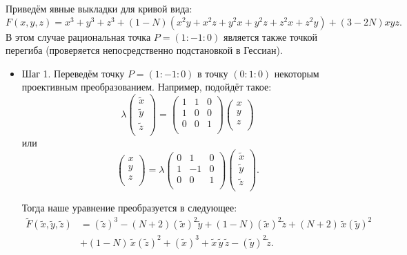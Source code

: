 \noindent Приведём явные выкладки для кривой вида:
\[
F(x, y, z) = x^3 + y^3 + z^3 + (1 - N) (x^2 y + x^2 z + y^2 x + y^2 z + z^2 x + z^2 y) +
(3 - 2 N) x y z 
.\] 
В этом случае рациональная точка \(P = (1 : -1 : 0)\) является также точкой перегиба
(проверяется непосредственно подстановкой в Гессиан).

\begin{itemize}[leftmargin=0.6cm]
    \item Шаг 1. Переведём точку \(P = (1 : -1 : 0)\) в точку
    \((0 : 1 : 0)\) некоторым проективным преобразованием. Например,
    подойдёт такое:
    \[
    \lambda
    \begin{pmatrix}
        \widetilde{x} \\
        \widetilde{y} \\
        \widetilde{z} \\
    \end{pmatrix} 
    = 
    \begin{pmatrix}
        1 & 1 & 0 \\
        1 & 0 & 0 \\
        0 & 0 & 1 \\
    \end{pmatrix}
    \begin{pmatrix}
        x \\
        y \\
        z \\
    \end{pmatrix}
    \]
    или
    \[
    \begin{pmatrix}
        x \\
        y \\
        z \\
    \end{pmatrix} =
    \lambda
    \begin{pmatrix}
        0 & 1 & 0 \\
        1 & -1 & 0 \\
        0 & 0 & 1 \\
    \end{pmatrix}
    \begin{pmatrix}
        \widetilde{x} \\
        \widetilde{y} \\
        \widetilde{z} \\
    \end{pmatrix} 
    .\] 
    

    Тогда наше уравнение преобразуется в следующее:  
    \begin{align*}
        \widetilde{F}(\widetilde{x}, \widetilde{y}, \widetilde{z}) &= 
     \left(\widetilde{z}\right)^3
     -(N + 2) \left(\widetilde{x}\right)^2 \widetilde{y} + (1 - N)
     \left(\widetilde{x}\right)^2 \widetilde{z} + (N + 2) \,
     \widetilde{x} \left(\widetilde{y}\right)^2 \\ 
     &+ (1 - N) \, \widetilde{x} \left(\widetilde{z}\right)^2 + 
     \left(\widetilde{x}\right)^3 + \widetilde{x} \,
     \widetilde{y} \, \widetilde{z} -
     \left(\widetilde{y}\right)^2 \widetilde{z}
    .\end{align*}
    


\end{itemize}
